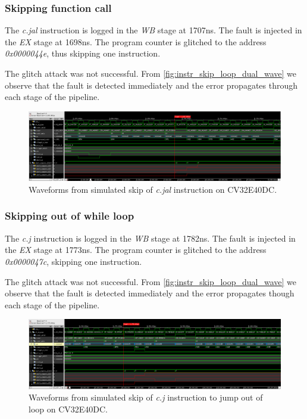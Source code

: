 \subsubsection{Skipping function call}

The \textit{c.jal} instruction is logged in the \textit{WB} stage at 1707ns. The fault is injected in the \textit{EX} stage at 1698ns. The program counter is glitched to the address \textit{0x0000044e}, thus skipping one instruction. 

The glitch attack was not successful. From \autoref{fig:instr_skip_loop_dual_wave} we observe that the fault is detected immediately and the error propagates through each stage of the pipeline. 

\begin{figure}[h!]
    \centering
    \includegraphics[width=\textwidth]{docs/images/instr_skip_dual_core.png}
    \caption{Waveforms from simulated skip of \textit{c.jal} instruction on CV32E40DC.}
    \label{fig:instr_skip_dual_wave}
\end{figure}


\subsubsection{Skipping out of while loop}

The \textit{c.j} instruction is logged in the \textit{WB} stage at 1782ns. The fault is injected in the \textit{EX} stage at 1773ns. The program counter is glitched to the address \textit{0x0000047c}, skipping one instruction.

The glitch attack was not successful. From \autoref{fig:instr_skip_loop_dual_wave} we observe that the fault is detected immediately and the error propagates though each stage of the pipeline. 

\begin{figure}[h!]
    \centering
    \includegraphics[width=\textwidth]{docs/images/instr_skip_loop_dual_core.png}
    \caption{Waveforms from simulated skip of \textit{c.j} instruction to jump out of loop on CV32E40DC.}
    \label{fig:instr_skip_loop_dual_wave}
\end{figure}


